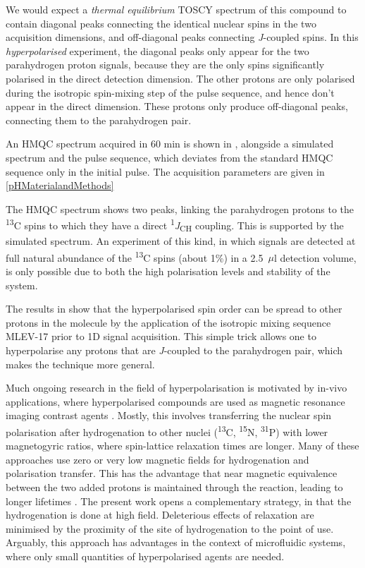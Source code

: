 We would expect a \emph{thermal equilibrium} TOSCY spectrum of this compound to
contain diagonal peaks connecting the identical nuclear spins in the two
acquisition dimensions, and off-diagonal peaks connecting \emph{J}-coupled
spins. In this \emph{hyperpolarised} experiment, the diagonal peaks only appear
for the two parahydrogen proton signals, because they are the only spins
significantly polarised in the direct detection dimension. The other protons
are only polarised during the isotropic spin-mixing step of the pulse sequence,
and hence don't appear in the direct dimension. These protons only produce
off-diagonal peaks, connecting them to the parahydrogen pair.

An HMQC spectrum acquired in 60 min is shown in , alongside
a simulated spectrum and the pulse sequence, which deviates from the standard
HMQC sequence only in the initial pulse. The acquisition parameters are given
in \ref{pHMaterialandMethods}

The HMQC spectrum shows two peaks, linking the parahydrogen protons to the
\textsuperscript{13}C spins to which they have a direct
\textsuperscript{1}\emph{J}\textsubscript{CH} coupling. This is supported by
the simulated spectrum. An experiment of this kind, in which signals are
detected at full natural abundance of the \textsuperscript{13}C spins (about
1\%) in a 2.5~$\mu$l  detection volume, is only possible due to both the high
polarisation levels and stability of the system.

The results in  show that the hyperpolarised spin order
can be spread to other
protons in the molecule by the application of the isotropic mixing
sequence MLEV-17 prior to 1D signal acquisition. This simple trick
allows one to hyperpolarise any protons that are \emph{J}-coupled to the
parahydrogen pair, which makes the technique more general.

Much ongoing research in the field of hyperpolarisation is
motivated by in-vivo applications, where hyperpolarised compounds
are used as magnetic
resonance imaging contrast agents \cite{Hovener:2018cg}.
Mostly, this involves transferring the
nuclear spin polarisation after hydrogenation to other nuclei
(\textsuperscript{13}C, \textsuperscript{15}N, \textsuperscript{31}P) with
lower magnetogyric ratios, where spin-lattice relaxation times are longer.
\cite{Goldman:2005bf,Goldman:2006cp,Reineri:2015he} Many of these approaches
use zero or very low magnetic fields for hydrogenation and polarisation
transfer. This has the advantage that near magnetic equivalence between the two
added protons is maintained through the reaction, leading to longer lifetimes
\cite{bhattacharya2007towards,chekmenev2008pasadena,
chekmenev2009hyperpolarized,shchepin2014parahydrogen,
Reineri:2015he,cavallari201813,ripka2018hyperpolarized,roy2018sabre}.
The present work opens a complementary strategy, in that the hydrogenation
is done at high field. Deleterious effects of relaxation are minimised by
the proximity of the site of hydrogenation to the point of use. Arguably,
this approach has advantages in the context of microfluidic systems, where
only small quantities of hyperpolarised agents are needed.

